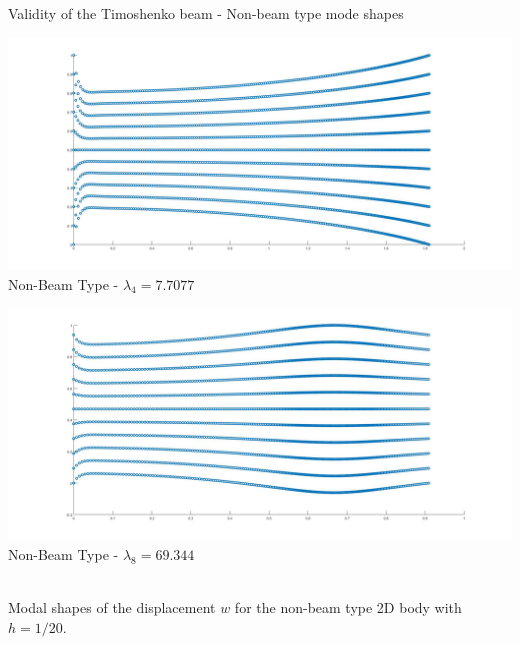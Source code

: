 \documentclass[8pt]{beamer}
\begin{document}
        \begin{frame}{Validity of the Timoshenko beam - Non-beam type mode shapes}
            \centering
            \begin{minipage}[b]{0.45\textwidth}
                \includegraphics[width=\textwidth]{NotBeam1.jpg}
                \\ Non-Beam Type - $\lambda_4 = 7.7077$
                \label{fig:nonbeam1}
            \end{minipage}
            \hfill
            \begin{minipage}[b]{0.45\textwidth}
                \includegraphics[width=\textwidth]{NotBeam2.jpg}
                \\ Non-Beam Type - $\lambda_8 = 69.344$
                \label{fig:nonbeam2}
            \end{minipage}
            \\ Modal shapes of the displacement $w$ for the non-beam type 2D body with $h = 1/20$.
        \end{frame}
        
\end{document}
